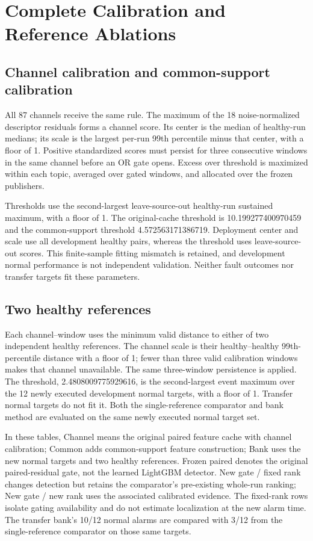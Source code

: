 \documentclass[10pt,a4paper]{article}
\begin{document}
\section{Complete Calibration and Reference Ablations}

\subsection*{Channel calibration and common-support calibration}
All 87 channels receive the same rule. The maximum of the 18 noise-normalized descriptor residuals forms a channel score. Its center is the median of healthy-run medians; its scale is the largest per-run 99th percentile minus that center, with a floor of 1. Positive standardized scores must persist for three consecutive windows in the same channel before an OR gate opens. Excess over threshold is maximized within each topic, averaged over gated windows, and allocated over the frozen publishers.

Thresholds use the second-largest leave-source-out healthy-run sustained maximum, with a floor of 1. The original-cache threshold is 10.199277400970459 and the common-support threshold 4.572563171386719. Deployment center and scale use all development healthy pairs, whereas the threshold uses leave-source-out scores. This finite-sample fitting mismatch is retained, and development normal performance is not independent validation. Neither fault outcomes nor transfer targets fit these parameters.

\subsection*{Two healthy references}
Each channel--window uses the minimum valid distance to either of two independent healthy references. The channel scale is their healthy--healthy 99th-percentile distance with a floor of 1; fewer than three valid calibration windows makes that channel unavailable. The same three-window persistence is applied. The threshold, 2.4808009775929616, is the second-largest event maximum over the 12 newly executed development normal targets, with a floor of 1. Transfer normal targets do not fit it. Both the single-reference comparator and bank method are evaluated on the same newly executed normal target set.




In these tables, Channel means the original paired feature cache with channel calibration; Common adds common-support feature construction; Bank uses the new normal targets and two healthy references. Frozen paired denotes the original paired-residual gate, not the learned LightGBM detector. New gate / fixed rank changes detection but retains the comparator's pre-existing whole-run ranking; New gate / new rank uses the associated calibrated evidence. The fixed-rank rows isolate gating availability and do not estimate localization at the new alarm time. The transfer bank's 10/12 normal alarms are compared with 3/12 from the single-reference comparator on those same targets.
\FloatBarrier
\end{document}
